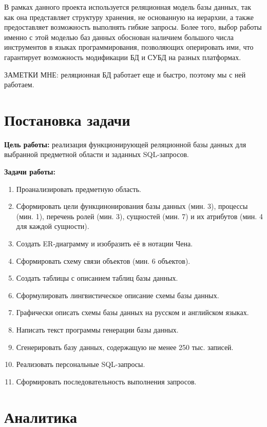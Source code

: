 \documentclass[14pt,a4paper]{extarticle}
\begin{document}
	В рамках данного проекта используется реляционная модель базы данных, так как она представляет структуру хранения, не основанную на иерархии, а также предоставляет возможность выполнять гибкие запросы. Более того, выбор работы именно с этой моделью баз данных обоснован наличием большого числа инструментов в языках программирования, позволяющих оперировать ими, что гарантирует возможность модификации БД и СУБД на разных платформах.
	
	
	ЗАМЕТКИ МНЕ: реляционная БД работает еще и быстро, поэтому мы с ней работаем.
	
	\newpage
	
	\section{Постановка задачи}
	
	\textbf{Цель работы:} реализация функционирующей реляционной базы данных для выбранной предметной области и заданных SQL-запросов.
	
	\textbf{Задачи работы:}
	\begin{enumerate}
		\item Проанализировать предметную область.
		\item Сформировать цели функцинонирования базы данных (мин. 3), процессы (мин. 1), перечень ролей (мин. 3), сущностей (мин. 7) и их атрибутов (мин. 4 для каждой сущности).
		\item Создать ER-диаграмму и изобразить её в нотации Чена.
		\item Сформировать схему связи объектов (мин. 6 объектов).
		\item Создать таблицы с описанием таблиц базы данных.
		\item Сформулировать лингвистическое описание схемы базы данных.
		\item Графически описать схемы базы данных на русском и английском языках.
		\item Написать текст программы генерации базы данных.
		\item Сгенерировать базу данных, содержащую не менее 250 тыс. записей.
		\item Реализовать персональные SQL-запросы.
		\item Сформировать последовательность выполнения запросов.
	\end{enumerate}
	
	\newpage
	
	\section{Аналитика}
\end{document}
